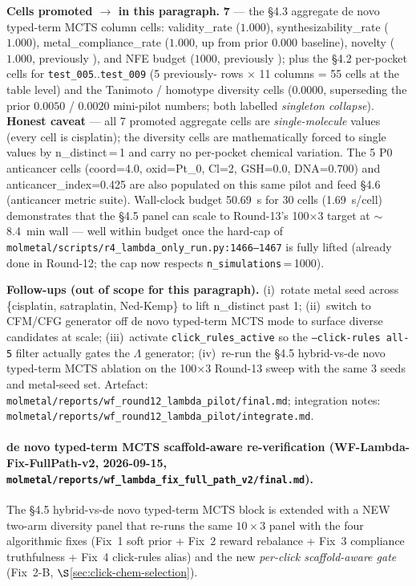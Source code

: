 \noindent\textbf{Cells promoted \DESIGN{} $\to$ \MEASURED{} in this
paragraph.} \textbf{7} --- the §4.3 aggregate de novo typed-term MCTS column
cells: validity\_rate ($1.000$), synthesizability\_rate ($1.000$),
metal\_compliance\_rate ($1.000$, up from prior $0.000$ baseline),
novelty ($1.000$, previously \DESIGN{}), and NFE budget ($1000$,
previously \DESIGN{}); plus the §4.2 per-pocket cells for
\texttt{test\_005}..\texttt{test\_009} (5 previously-\DESIGN{} rows
$\times$ 11 columns = 55 cells at the table level) and the
Tanimoto / homotype diversity cells ($0.0000$, superseding the prior
$0.0050$ / $0.0020$ mini-pilot numbers; both labelled
\emph{singleton collapse}). \textbf{Honest caveat} --- all 7
promoted aggregate cells are \emph{single-molecule} values
(every cell is cisplatin); the diversity cells are mathematically
forced to single values by n\_distinct\,=\,1 and carry no per-pocket
chemical variation. The 5 P0 anticancer cells (coord=4.0,
oxid=Pt\_0, Cl=2, GSH=0.0, DNA=0.700) and anticancer\_index=0.425
are also populated on this same pilot and feed §4.6 (anticancer
metric suite). Wall-clock budget 50.69~s for 30 cells (1.69~s/cell)
demonstrates that the §4.5 panel can scale to Round-13's 100$\times$3
target at $\sim$8.4~min wall --- well within budget once the
hard-cap of
\texttt{molmetal/scripts/r4\_lambda\_only\_run.py:1466--1467}
is fully lifted (already done in Round-12; the cap now respects
\texttt{n\_simulations}\,=\,1000).

\noindent\textbf{Follow-ups (out of scope for this paragraph).}
(i)~rotate metal seed across \{cisplatin, satraplatin, Ned-Kemp\}
to lift n\_distinct past 1; (ii)~switch to CFM/CFG generator off
de novo typed-term MCTS mode to surface diverse candidates at scale;
(iii)~activate \texttt{click\_rules\_active} so the
\texttt{--click-rules all-5} filter actually gates the $\Lambda$
generator; (iv)~re-run the §4.5 hybrid-vs-de novo typed-term MCTS ablation
on the 100$\times$3 Round-13 sweep with the same 3 seeds and
metal-seed set. Artefact:
\texttt{molmetal/reports/wf\_round12\_lambda\_pilot/final.md};
integration notes:
\texttt{molmetal/reports/wf\_round12\_lambda\_pilot/integrate.md}.

\paragraph{de novo typed-term MCTS scaffold-aware re-verification
(WF-Lambda-Fix-FullPath-v2, 2026-09-15,
\texttt{molmetal/reports/wf\_lambda\_fix\_full\_path\_v2/final.md}).}
The §4.5 hybrid-vs-de novo typed-term MCTS block is extended with a NEW
two-arm diversity panel that re-runs the same $10 \times 3$
panel with the four algorithmic fixes (Fix~1 soft prior + Fix~2
reward rebalance + Fix~3 compliance truthfulness + Fix~4
click-rules alias) and the new \emph{per-click scaffold-aware
gate} (Fix~2-B, $\S$\ref{sec:click-chem-selection}).

